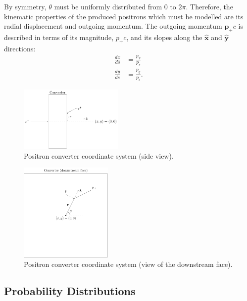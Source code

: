 \documentclass[letter,
               biblatex,     %
               keeplastbox,   %
               ]{jacow}
\newcommand{\xx}{\mathbf{\hat{x}}}
\newcommand{\yy}{\mathbf{\hat{y}}}
\begin{document}
By symmetry, $\theta$ must be uniformly distributed from 0 to $2\pi$.
Therefore, the kinematic properties of the produced positrons which must be modelled are its radial displacement and outgoing momentum.
The outgoing momentum $\mathbf{p}_+ c$ is described in terms of its magnitude, $p_+ c$, and its slopes along the $\xx$ and $\yy$ directions:
\begin{align}
\frac{dx}{ds} & = \frac{p_x}{p_s} \\
\frac{dy}{ds} & = \frac{p_y}{p_s}.
\end{align}


\begin{figure}
\centering
\includegraphics[width=0.45\textwidth]{coords1.pdf}
\caption{Positron converter coordinate system (side view).}
\label{fig:coords1}
\end{figure}

\begin{figure}
\centering
\includegraphics[width=0.4\textwidth]{coords2.pdf}
\caption{Positron converter coordinate system (view of the downstream face).}
\label{fig:coords2}
\end{figure}

\subsection{Probability Distributions}
\end{document}
